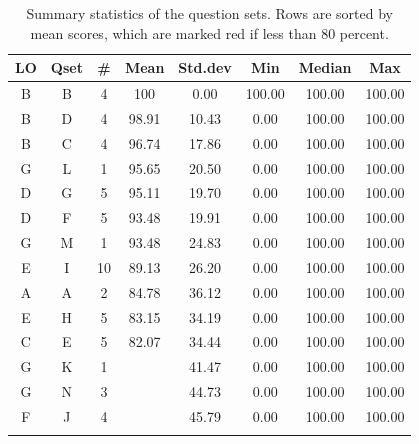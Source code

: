 \documentclass[12pt,english,nohyper]{tufte-handout}\usepackage[]{graphicx}\usepackage[]{color}
\begin{document}
\begin{fullwidth}
\makeatletter\setlength\hsize{\@tufte@fullwidth}\makeatother
\begin{longtable}{cc|ccc|ccc}
  \hline
LO & Qset & \# & Mean & Std.dev & Min & Median & Max \\ 
  \hline
B & B &   4 & 100 & 0.00 & 100.00 & 100.00 & 100.00 \\ 
  B & D &   4 & 98.91 & 10.43 & 0.00 & 100.00 & 100.00 \\ 
  B & C &   4 & 96.74 & 17.86 & 0.00 & 100.00 & 100.00 \\ 
  G & L &   1 & 95.65 & 20.50 & 0.00 & 100.00 & 100.00 \\ 
  D & G &   5 & 95.11 & 19.70 & 0.00 & 100.00 & 100.00 \\ 
  D & F &   5 & 93.48 & 19.91 & 0.00 & 100.00 & 100.00 \\ 
  G & M &   1 & 93.48 & 24.83 & 0.00 & 100.00 & 100.00 \\ 
  E & I &  10 & 89.13 & 26.20 & 0.00 & 100.00 & 100.00 \\ 
  A & A &   2 & 84.78 & 36.12 & 0.00 & 100.00 & 100.00 \\ 
  E & H &   5 & 83.15 & 34.19 & 0.00 & 100.00 & 100.00 \\ 
  C & E &   5 & 82.07 & 34.44 & 0.00 & 100.00 & 100.00 \\ 
  G & K &   1 & \color{red}{78.26} & 41.47 & 0.00 & 100.00 & 100.00 \\ 
  G & N &   3 & \color{red}{72.83} & 44.73 & 0.00 & 100.00 & 100.00 \\ 
  F & J &   4 & \color{red}{70.65} & 45.79 & 0.00 & 100.00 & 100.00 \\ 
   \hline
\hline
\caption{Summary statistics of the question sets. Rows are sorted by mean scores, which are marked red if less than 80 percent.} 
\label{tab:QuestionSet_summary}
\end{longtable}

\end{fullwidth}
\end{document}
